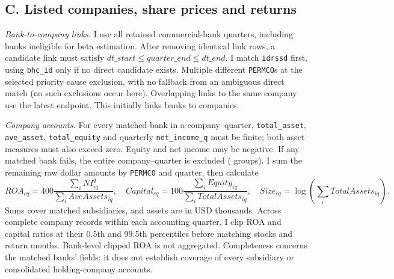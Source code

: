 \documentclass[10pt]{article}
\begin{document}
\subsection*{C. Listed companies, share prices and returns}
\textit{Bank-to-company links.} I use all retained commercial-bank quarters, including banks ineligible for beta estimation. After removing identical link rows, a candidate link must satisfy $dt\_start\leq quarter\_end\leq dt\_end$. I match \texttt{idrssd} first, using \texttt{bhc\_id} only if no direct candidate exists. Multiple different \texttt{PERMCO}s at the selected priority cause exclusion, with no fallback from an ambiguous direct match (no such exclusions occur here). Overlapping links to the same company use the latest endpoint. This initially links \LinkedBanks{} banks to \LinkedCompanies{} companies.

\textit{Company accounts.} For every matched bank in a company--quarter, \texttt{total\_asset}, \texttt{ave\_asset}, \texttt{total\_equity} and quarterly \texttt{net\_income\_q} must be finite; both asset measures must also exceed zero. Equity and net income may be negative. If any matched bank fails, the entire company--quarter is excluded (\IncompleteGroups{} groups). I sum the remaining raw dollar amounts by \texttt{PERMCO} and quarter, then calculate
\[
 ROA_{cq}=400\frac{\sum_i NI^q_{iq}}{\sum_i AveAssets_{iq}},\quad
 Capital_{cq}=100\frac{\sum_i Equity_{iq}}{\sum_i TotalAssets_{iq}},\quad
 Size_{cq}=\log\!\left(\sum_i TotalAssets_{iq}\right).
\]
Sums cover matched subsidiaries, and assets are in USD thousands. Across complete company records within each accounting quarter, I clip ROA and capital ratios at their 0.5th and 99.5th percentiles before matching stocks and return months. Bank-level clipped ROA is not aggregated. Completeness concerns the matched banks' fields; it does not establish coverage of every subsidiary or consolidated holding-company accounts.
\end{document}
